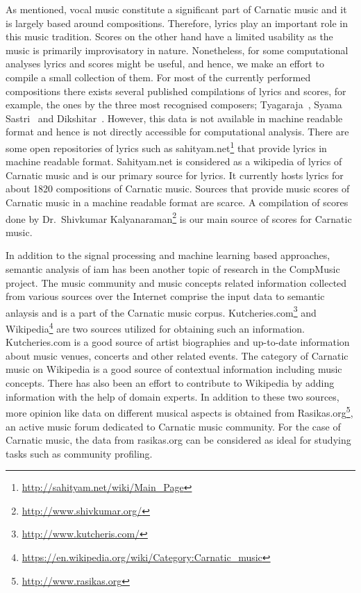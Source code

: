 As mentioned, vocal music constitute a significant part of Carnatic music and it is largely based around compositions. Therefore, lyrics play an important role in this music tradition. Scores on the other hand have a limited usability as the music is primarily improvisatory in nature. Nonetheless, for some computational analyses lyrics and scores might be useful, and hence, we make an effort to compile a small collection of them. For most of the currently performed compositions there exists several published compilations of lyrics and scores, for example, the ones by the three most recognised composers; Tyagaraja~\citep{TKG_Rao_Tyagaraja}, Syama Sastri~\citep{TKG_Rao_syama} and Dikshitar~\citep{TKG_Rao_Muddusvami}. However, this data is not available in machine readable format and hence is not directly accessible for computational analysis. There are some open repositories of lyrics such as sahityam.net\footnote{\url{http://sahityam.net/wiki/Main_Page}} that provide lyrics in machine readable format. Sahityam.net is considered as a wikipedia of lyrics of Carnatic music and is our primary source for lyrics. It currently hosts lyrics for about 1820 compositions of Carnatic music. Sources that provide music scores of Carnatic music in a machine readable format are scarce. A compilation of scores done by Dr.~Shivkumar Kalyanaraman\footnote{\url{http://www.shivkumar.org/}} is our main source of scores for Carnatic music.

In addition to the signal processing and machine learning based approaches, semantic analysis of \gls{iam} has been another topic of research in the CompMusic project. The music community and music concepts related information collected from various sources over the Internet comprise the input data to semantic anlaysis and is a part of the Carnatic music corpus. Kutcheries.com\footnote{\url{http://www.kutcheris.com/}} and Wikipedia\footnote{\url{https://en.wikipedia.org/wiki/Category:Carnatic_music}} are two sources utilized for obtaining such an information. Kutcheries.com is a good source of artist biographies and up-to-date information about music venues, concerts and other related events. The category of Carnatic music on Wikipedia is a good source of contextual information including music concepts. There has also been an effort to contribute to Wikipedia by adding information with the help of domain experts. In addition to these two sources, more opinion like data on different musical aspects is obtained from Rasikas.org\footnote{\url{http://www.rasikas.org}}, an active music forum dedicated to Carnatic music community. For the case of Carnatic music, the data from rasikas.org can be considered as ideal for studying tasks such as community profiling.


